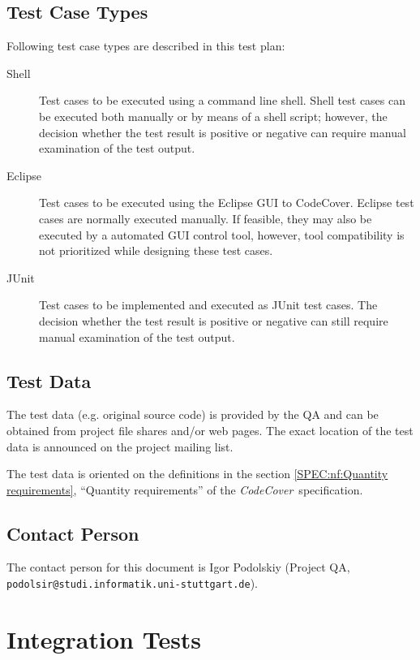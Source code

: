 \documentclass[a4paper,12pt,liststotoc,DIV12]{scrartcl}
\newcommand{\gbt}{\textit{CodeCover}}
\begin{document}
\subsection{Test Case Types}
\label{sec:test-case-types}

Following test case types are described in this test plan:

\begin{description}
\item[Shell] Test cases to be executed using a command line shell.
  Shell test cases can be executed both manually or by means of a
  shell script; however, the decision whether the test result is
  positive or negative can require manual examination of the test output.
\item[Eclipse] Test cases to be executed using the Eclipse GUI to CodeCover.
  Eclipse test cases are normally executed manually. If feasible, they may also
  be executed by a automated GUI control tool, however, tool compatibility is
  not prioritized while designing these test cases.
\item[JUnit] Test cases to be implemented and executed as JUnit test cases.
  The decision whether the test result is positive or negative can still
  require manual examination of the test output.
\end{description}

\subsection{Test Data}
\label{sec:test-data}

The test data (e.g. original source code) is provided by the QA and
can be obtained from project file shares and/or web pages. The exact
location of the test data is announced on the project mailing list.

The test data is oriented on the definitions in the section
\ref{SPEC:nf:Quantity requirements}, ``Quantity requirements'' of the \gbt\ specification.

\subsection{Contact Person}
\label{sec:contact-person}

The contact person for this document is Igor Podolskiy
(Project QA, \texttt{podolsir@studi.informatik.uni-stuttgart.de}).

\section{Integration Tests}
\label{sec:integration-tests}
\end{document}
